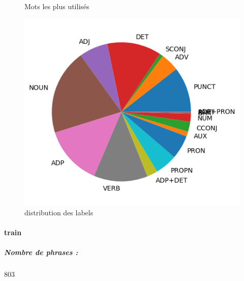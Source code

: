 \begin{figure}[H]
\begin{minipage}{0.48\textwidth}
\begin{tabular}{|l || *{11 }{|c} |}
\end{tabular}
\caption{ Mots les plus utilisés } \label{Fig:muw}\end{minipage} 
\begin{minipage}{0.48\textwidth} \centering
\includegraphics[width=.7\linewidth]{pudtest_img.png}
\caption{distribution des labels}
\end{minipage}
\end{figure} \paragraph{train } 
\subparagraph{Nombre de phrases :} 803\\ 

